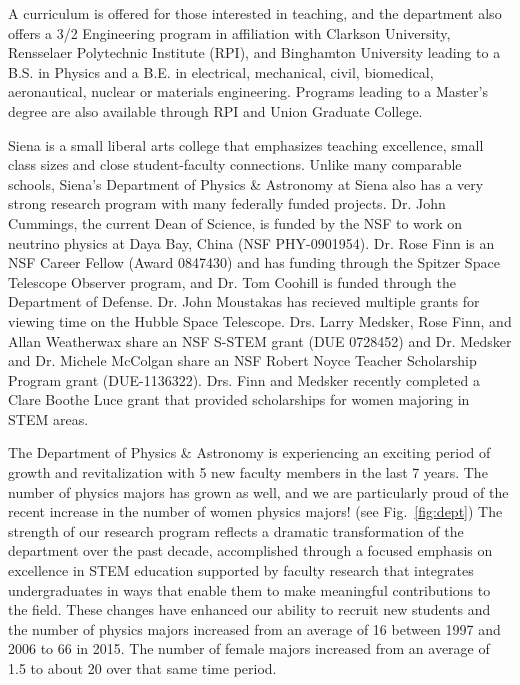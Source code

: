 \documentclass[12pt, preprint]{aastex}
\begin{document}
A curriculum is offered for those interested in teaching, and the department also offers a 3/2 Engineering
program in affiliation with Clarkson University, Rensselaer Polytechnic Institute (RPI),
and Binghamton University leading to a B.S. in Physics and a
B.E. in electrical, mechanical, civil, biomedical, aeronautical, nuclear or materials engineering.
Programs leading to a Master's degree are also available through RPI and Union Graduate College.

Siena is a small liberal arts college that emphasizes teaching excellence, small class sizes and close 
student-faculty connections.  Unlike many comparable schools, Siena's Department of Physics \&
Astronomy at Siena also has a very strong research program with many federally funded projects.  
Dr. John Cummings, the current Dean of Science, is funded by the NSF to work on 
neutrino physics at Daya Bay, China (NSF PHY-0901954).  Dr. Rose Finn is an 
NSF Career Fellow (Award 0847430) and has funding through the Spitzer Space Telescope Observer program, 
and Dr. Tom Coohill is funded through the Department of Defense.  Dr. John Moustakas
has recieved multiple grants for viewing time on the Hubble Space Telescope. Drs. Larry Medsker, Rose Finn, and 
Allan Weatherwax share an NSF S-STEM grant (DUE 0728452) and Dr. Medsker and Dr. Michele McColgan share 
an NSF Robert Noyce Teacher Scholarship Program grant (DUE-1136322). Drs. Finn and Medsker recently 
completed a Clare Boothe Luce grant that provided scholarships for women majoring in STEM areas. 
 
The Department of Physics \& Astronomy is experiencing an exciting
period of growth and revitalization with 5 new faculty members in the
last 7 years.  The number of physics majors has grown as well, and we
are particularly proud of the recent increase in the number of women
physics majors! (see Fig.~\ref{fig:dept})
The strength of our research program reflects a dramatic transformation of the department over the 
past decade, accomplished through a focused emphasis on excellence in STEM education supported by 
faculty research that integrates undergraduates in ways that enable them to make meaningful contributions 
to the field.  These changes have enhanced our ability to recruit new students and the number of 
physics majors increased from an average of 16 between 1997 and 2006 to 66 in 2015. The number of 
female majors increased from an average of 1.5 to about 20 over that same time period.
 
\end{document}
